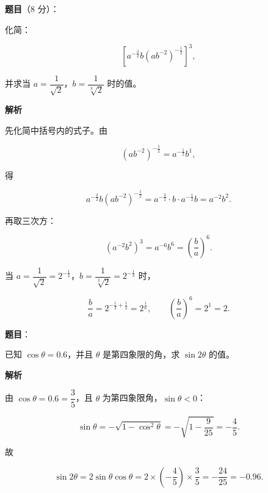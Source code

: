 \begin{answer}

\textbf{题目}（8 分）：

化简：

\nopagebreak[4]
\[
\left[a^{-\frac32}b\left(ab^{-2}\right)^{-\frac12}\right]^3,
\]

并求当 $a=\dfrac{1}{\sqrt2}$，$b=\dfrac{1}{\sqrt[3]2}$ 时的值。

\textbf{解析}

先化简中括号内的式子。由

\nopagebreak[4]
\[
(ab^{-2})^{-\frac12}=a^{-\frac12}b^{1},
\]

得

\nopagebreak[4]
\[
a^{-\frac32}b\left(ab^{-2}\right)^{-\frac12}
=a^{-\frac32}\cdot b\cdot a^{-\frac12}b
=a^{-2}b^2.
\]

再取三次方：

\nopagebreak[4]
\[
\left(a^{-2}b^2\right)^3=a^{-6}b^6=\left(\frac ba\right)^6.
\]

当 $a=\dfrac1{\sqrt2}=2^{-\frac12}$，$b=\dfrac1{\sqrt[3]2}=2^{-\frac13}$ 时，

\nopagebreak[4]
\[
\frac ba=2^{-\frac13+\frac12}=2^{\frac16},
\qquad
\left(\frac ba\right)^6=2^{1}=2.
\]


\end{answer}
\begin{answer}

\textbf{题目}：

已知 $\cos\theta=0.6$，并且 $\theta$ 是第四象限的角，求 $\sin2\theta$ 的值。

\textbf{解析}

由 $\cos\theta=0.6=\dfrac35$，且 $\theta$ 为第四象限角，$\sin\theta<0$：

\nopagebreak[4]
\[
\sin\theta=-\sqrt{1-\cos^2\theta}=-\sqrt{1-\frac9{25}}=-\frac45.
\]

故

\nopagebreak[4]
\[
\sin2\theta=2\sin\theta\cos\theta=2\times\left(-\frac45\right)\times\frac35=-\frac{24}{25}=-0.96.
\]


\end{answer}
